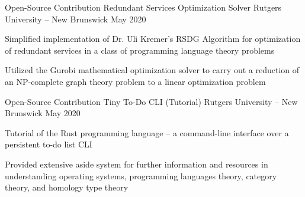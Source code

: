 
\begin{cventries}
  \cventry
  {Open-Source Contribution}
  {Redundant Services Optimization Solver}
  {Rutgers University -- New Brunswick}
  {May 2020}
  {
    \begin{cvitems}
    \item {Simplified implementation of Dr. Uli Kremer's RSDG Algorithm for optimization of redundant services in a class of programming language theory problems}
    \item {Utilized the Gurobi mathematical optimization solver to carry out a reduction of an NP-complete graph theory problem to a linear optimization problem}
    \end{cvitems}
  }

  \cventry
  {Open-Source Contribution}
  {Tiny To-Do CLI (Tutorial)}
  {Rutgers University -- New Brunswick}
  {May 2020}
  {
    \begin{cvitems}
    \item {Tutorial of the Rust programming language -- a command-line interface over a persistent to-do list CLI}
    \item {Provided extensive aside system for further information and resources in understanding operating systems, programming languages theory, category theory, and homology type theory}
    \end{cvitems}
  }
\end{cventries}
